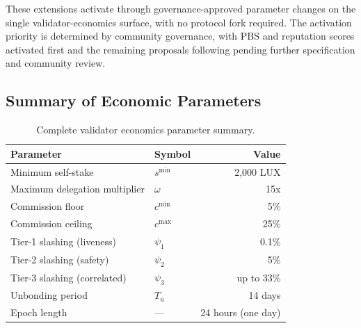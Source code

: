 These extensions activate through governance-approved parameter changes on the
single validator-economics surface, with no protocol fork required.
The activation priority is determined by community governance,
with PBS and reputation scores activated first and the remaining
proposals following pending further specification and community review.

\subsection{Summary of Economic Parameters}

\begin{table}[H]
\centering
\caption{Complete validator economics parameter summary.}
\label{tab:paramsum}
\begin{tabular}{llr}
\toprule
\textbf{Parameter} & \textbf{Symbol} & \textbf{Value} \\
\midrule
Minimum self-stake & $s^{\min}$ & 2,000 LUX \\
Maximum delegation multiplier & $\omega$ & 15x \\
Commission floor & $c^{\min}$ & 5\% \\
Commission ceiling & $c^{\max}$ & 25\% \\
Tier-1 slashing (liveness) & $\psi_1$ & 0.1\% \\
Tier-2 slashing (safety) & $\psi_2$ & 5\% \\
Tier-3 slashing (correlated) & $\psi_3$ & up to 33\% \\
Unbonding period & $T_u$ & 14 days \\
Epoch length & --- & 24 hours (one day) \\
\bottomrule
\end{tabular}
\end{table}

